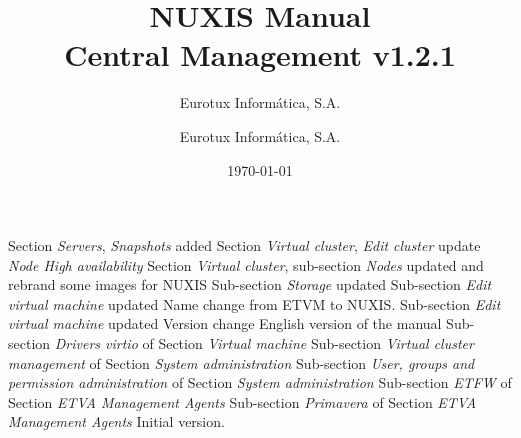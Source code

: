 \documentclass[12pt,a4paper,english]{scrreprt}
\author{Eurotux Informática, S.A.}
\title{NUXIS Manual\\Central Management v1.2.1}
\subtitle{Eurotux Informática, S.A.}
\date{\today}
\begin{document}
\maketitle

\begin{Log}
Section \textit{Servers}, \textit{Snapshots} added
Section \textit{Virtual cluster}, \textit{Edit cluster} update \textit{Node High availability}
Section \textit{Virtual cluster}, sub-section \textit{Nodes} updated and rebrand some images for NUXIS
Sub-section \textit{Storage} updated 
Sub-section \textit{Edit virtual machine} updated 
Name change from ETVM to NUXIS. Sub-section \textit{Edit virtual machine} updated 
Version change
English version of the manual
Sub-section \textit{Drivers virtio} of Section \textit{Virtual machine}
Sub-section \textit{Virtual cluster management} of Section \textit{System administration}
Sub-section \textit{User, groups and permission administration} of Section \textit{System administration}
Sub-section \textit{ETFW} of Section \textit{ETVA Management Agents}
Sub-section \textit{Primavera} of Section \textit{ETVA Management Agents}
Initial version.
\end{Log}

\tableofcontents

\listoffigures


%
%


%
\end{document}
